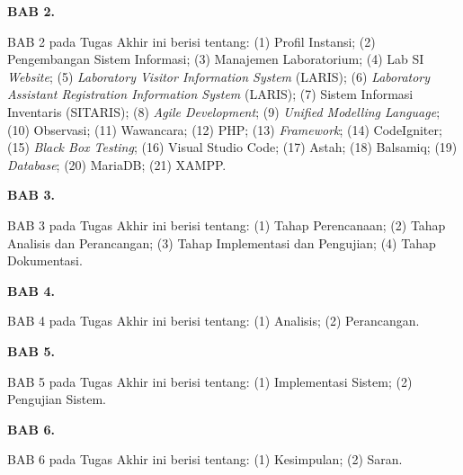 \textbf{BAB 2. \babDua}

BAB 2 pada Tugas Akhir ini berisi tentang: (1) Profil Instansi; (2) Pengembangan Sistem Informasi; (3) Manajemen Laboratorium; (4) Lab SI \textit{Website}; (5) \textit{Laboratory Visitor Information System} (LARIS); (6) \textit{Laboratory Assistant Registration Information System} (LARIS); (7) Sistem Informasi Inventaris (SITARIS); (8) \textit{Agile Development}; (9) \textit{Unified Modelling Language}; (10) Observasi; (11) Wawancara; (12) PHP; (13) \textit{Framework}; (14) CodeIgniter; (15) \textit{Black Box Testing}; (16) Visual Studio Code; (17) Astah; (18) Balsamiq; (19) \textit{Database}; (20) MariaDB; (21) XAMPP.

\textbf{BAB 3. \babTiga}

BAB 3 pada Tugas Akhir ini berisi tentang: (1) Tahap Perencanaan; (2) Tahap Analisis dan Perancangan; (3) Tahap Implementasi dan Pengujian; (4) Tahap Dokumentasi.

\textbf{BAB 4. \babEmpat}

BAB 4 pada Tugas Akhir ini berisi tentang: (1) Analisis; (2) Perancangan.

\textbf{BAB 5. \babLima}

BAB 5 pada Tugas Akhir ini berisi tentang: (1) Implementasi Sistem; (2) Pengujian Sistem.

\textbf{BAB 6. \babEnam}

BAB 6 pada Tugas Akhir ini berisi tentang: (1) Kesimpulan; (2) Saran.
